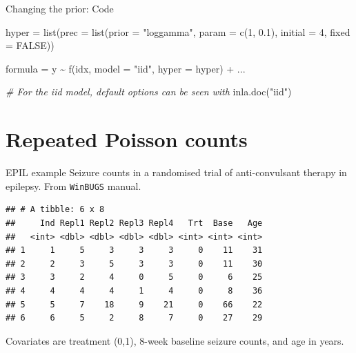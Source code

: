 \documentclass[
  ignorenonframetext,
]{beamer}
\newenvironment{Shaded}{\begin{snugshade}}{\end{snugshade}}
\newcommand{\AttributeTok}[1]{\textcolor[rgb]{0.77,0.63,0.00}{#1}}
\newcommand{\CommentTok}[1]{\textcolor[rgb]{0.56,0.35,0.01}{\textit{#1}}}
\newcommand{\ConstantTok}[1]{\textcolor[rgb]{0.00,0.00,0.00}{#1}}
\newcommand{\DecValTok}[1]{\textcolor[rgb]{0.00,0.00,0.81}{#1}}
\newcommand{\FloatTok}[1]{\textcolor[rgb]{0.00,0.00,0.81}{#1}}
\newcommand{\FunctionTok}[1]{\textcolor[rgb]{0.00,0.00,0.00}{#1}}
\newcommand{\NormalTok}[1]{#1}
\newcommand{\OtherTok}[1]{\textcolor[rgb]{0.56,0.35,0.01}{#1}}
\newcommand{\SpecialCharTok}[1]{\textcolor[rgb]{0.00,0.00,0.00}{#1}}
\newcommand{\StringTok}[1]{\textcolor[rgb]{0.31,0.60,0.02}{#1}}
\begin{document}
\begin{frame}[fragile]{Changing the prior: Code}
\protect\hypertarget{changing-the-prior-code}{}
\begin{Shaded}
\begin{Highlighting}[]
\NormalTok{hyper }\OtherTok{=} \FunctionTok{list}\NormalTok{(}\AttributeTok{prec =} \FunctionTok{list}\NormalTok{(}\AttributeTok{prior =} \StringTok{"loggamma"}\NormalTok{,}
                         \AttributeTok{param =} \FunctionTok{c}\NormalTok{(}\DecValTok{1}\NormalTok{, }\FloatTok{0.1}\NormalTok{),}
                         \AttributeTok{initial =} \DecValTok{4}\NormalTok{,}
                         \AttributeTok{fixed =} \ConstantTok{FALSE}\NormalTok{))}

\NormalTok{formula }\OtherTok{=}\NormalTok{ y }\SpecialCharTok{\textasciitilde{}} \FunctionTok{f}\NormalTok{(idx, }\AttributeTok{model =} \StringTok{"iid"}\NormalTok{, }\AttributeTok{hyper =}\NormalTok{ hyper) }\SpecialCharTok{+}\NormalTok{ ...}
\end{Highlighting}
\end{Shaded}

\begin{Shaded}
\begin{Highlighting}[]
\CommentTok{\# For the iid model, default options can be seen with}
\FunctionTok{inla.doc}\NormalTok{(}\StringTok{"iid"}\NormalTok{)}
\end{Highlighting}
\end{Shaded}

\normalsize
\end{frame}

\hypertarget{repeated-poisson-counts}{%
\section{Repeated Poisson counts}\label{repeated-poisson-counts}}

\begin{frame}[fragile]{EPIL example}
\protect\hypertarget{epil-example}{}
Seizure counts in a randomised trial of anti-convulsant therapy in
epilepsy. From \texttt{WinBUGS} manual. \small

\begin{verbatim}
## # A tibble: 6 x 8
##     Ind Repl1 Repl2 Repl3 Repl4   Trt  Base   Age
##   <int> <dbl> <dbl> <dbl> <dbl> <int> <int> <int>
## 1     1     5     3     3     3     0    11    31
## 2     2     3     5     3     3     0    11    30
## 3     3     2     4     0     5     0     6    25
## 4     4     4     4     1     4     0     8    36
## 5     5     7    18     9    21     0    66    22
## 6     6     5     2     8     7     0    27    29
\end{verbatim}

\normalsize

Covariates are treatment (0,1), 8-week baseline seizure counts, and age
in years.
\end{frame}
\end{document}
